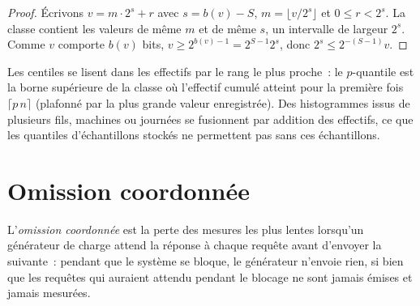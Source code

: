 \begin{proof}
Écrivons $v = m \cdot 2^{s} + r$ avec $s = b(v) - S$, $m = \lfloor v/2^s \rfloor$ et $0 \le r < 2^s$. La classe contient les valeurs de même $m$ et de même $s$,
un intervalle de largeur $2^s$. Comme $v$ comporte $b(v)$ bits, $v \ge 2^{b(v)-1} = 2^{S-1}2^s$,
donc $2^s \le 2^{-(S-1)}v$.
\end{proof}

Les centiles se lisent dans les effectifs par le rang le plus proche~: le $p$-quantile est la borne supérieure de la classe où
l'effectif cumulé atteint pour la première fois $\lceil p\,n \rceil$ (plafonné par la plus grande valeur enregistrée). Des histogrammes issus de plusieurs
fils, machines ou journées se fusionnent par addition des effectifs, ce que les quantiles d'échantillons stockés ne permettent pas sans ces échantillons.

\section{Omission coordonnée}

\begin{definition}\label{def:ll:measuring-latency:co}
L'\emph{omission coordonnée} est la perte des mesures les plus lentes lorsqu'un générateur de charge
attend la réponse à chaque requête avant d'envoyer la suivante~: pendant que le système se bloque, le générateur n'envoie rien, si bien que les
requêtes qui auraient attendu pendant le blocage ne sont jamais émises et jamais mesurées.
\end{definition}

